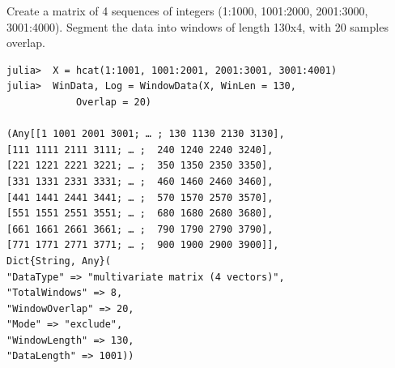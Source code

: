 \documentclass[12pt, a4paper, titlepage, openany]{book}
\begin{document}
\newpage
\noindent Create a matrix of 4 sequences of integers (1:1000, 1001:2000, 2001:3000, 3001:4000). Segment the data into windows of length 130x4, with 20 samples overlap.
\begin{verbatim}
julia>  X = hcat(1:1001, 1001:2001, 2001:3001, 3001:4001)
julia>  WinData, Log = WindowData(X, WinLen = 130, 
			Overlap = 20)

(Any[[1 1001 2001 3001; … ; 130 1130 2130 3130], 
[111 1111 2111 3111; … ;  240 1240 2240 3240],
[221 1221 2221 3221; … ;  350 1350 2350 3350], 
[331 1331 2331 3331; … ;  460 1460 2460 3460], 
[441 1441 2441 3441; … ;  570 1570 2570 3570],
[551 1551 2551 3551; … ;  680 1680 2680 3680],
[661 1661 2661 3661; … ;  790 1790 2790 3790], 
[771 1771 2771 3771; … ;  900 1900 2900 3900]], 
Dict{String, Any}(
"DataType" => "multivariate matrix (4 vectors)", 
"TotalWindows" => 8, 
"WindowOverlap" => 20, 
"Mode" => "exclude", 
"WindowLength" => 130, 
"DataLength" => 1001))
\end{verbatim}


\end{document}
